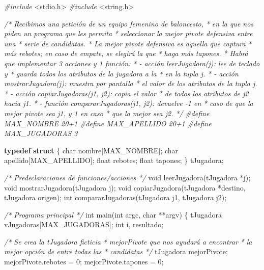 \documentclass[
]{book}
\newenvironment{Shaded}{\begin{snugshade}}{\end{snugshade}}
\newcommand{\CommentTok}[1]{\textcolor[rgb]{0.56,0.35,0.01}{\textit{#1}}}
\newcommand{\DataTypeTok}[1]{\textcolor[rgb]{0.13,0.29,0.53}{#1}}
\newcommand{\DecValTok}[1]{\textcolor[rgb]{0.00,0.00,0.81}{#1}}
\newcommand{\ImportTok}[1]{#1}
\newcommand{\KeywordTok}[1]{\textcolor[rgb]{0.13,0.29,0.53}{\textbf{#1}}}
\newcommand{\NormalTok}[1]{#1}
\newcommand{\PreprocessorTok}[1]{\textcolor[rgb]{0.56,0.35,0.01}{\textit{#1}}}
\begin{document}
\begin{Shaded}
\begin{Highlighting}[]
\PreprocessorTok{\#include }\ImportTok{\textless{}stdio.h\textgreater{}}
\PreprocessorTok{\#include }\ImportTok{\textless{}string.h\textgreater{}}

\CommentTok{/* Recibimos una petición de un equipo femenino de baloncesto,}
\CommentTok{ * en la que nos piden un programa que les permita}
\CommentTok{ * seleccionar la mejor pivote defensiva entre una}
\CommentTok{ * serie de candidatas.}
\CommentTok{ * La mejor pivote defensiva es aquella que captura}
\CommentTok{ * más rebotes; en caso de empate, se elegirá la que}
\CommentTok{ * haga más tapones.}
\CommentTok{ * Habrá que implementar 3 acciones y 1 función:}
\CommentTok{ * {-} acción leerJugadora(j): lee de teclado y}
\CommentTok{ *   guarda todos los atributos de la jugadora a la}
\CommentTok{ *   en la tupla j.}
\CommentTok{ * {-} acción mostrarJugadora(j): muestra por pantalla}
\CommentTok{ *   el valor de los atributos de la tupla j.}
\CommentTok{ * {-} acción copiarJugadoras(j1, j2): copia el valor}
\CommentTok{ *   de todos los atributos de j2 hacia j1.}
\CommentTok{ * {-} función compararJugadoras(j1, j2): devuelve {-}1 en}
\CommentTok{ *   caso de que la mejor pivote sea j1, y 1 en caso}
\CommentTok{ *   que la mejor sea j2.}
\CommentTok{ */}
\PreprocessorTok{\#define MAX\_NOMBRE 20+1}
\PreprocessorTok{\#define MAX\_APELLIDO 20+1}
\PreprocessorTok{\#define MAX\_JUGADORAS 3}

\KeywordTok{typedef} \KeywordTok{struct}\NormalTok{ \{}
    \DataTypeTok{char}\NormalTok{ nombre[MAX\_NOMBRE];}
    \DataTypeTok{char}\NormalTok{ apellido[MAX\_APELLIDO];}
    \DataTypeTok{float}\NormalTok{ rebotes;}
    \DataTypeTok{float}\NormalTok{ tapones;}
\NormalTok{\} tJugadora;}

\CommentTok{/* Predeclaraciones de funciones/acciones */}
\DataTypeTok{void}\NormalTok{ leerJugadora(tJugadora *j);}
\DataTypeTok{void}\NormalTok{ mostrarJugadora(tJugadora j);}
\DataTypeTok{void}\NormalTok{ copiarJugadora(tJugadora *destino, tJugadora origen);}
\DataTypeTok{int}\NormalTok{ compararJugadoras(tJugadora j1, tJugadora j2);}

\CommentTok{/* Programa principal */}
\DataTypeTok{int}\NormalTok{ main(}\DataTypeTok{int}\NormalTok{ argc, }\DataTypeTok{char}\NormalTok{ **argv) \{}
\NormalTok{    tJugadora vJugadoras[MAX\_JUGADORAS];}
    \DataTypeTok{int}\NormalTok{ i, resultado;}

    \CommentTok{/* Se crea la tJugadora ficticia}
\CommentTok{     * mejorPivote que nos ayudará a encontrar}
\CommentTok{     * la mejor opción de entre todas las}
\CommentTok{     * candidatas}
\CommentTok{     */}
\NormalTok{    tJugadora mejorPivote; }
\NormalTok{    mejorPivote.rebotes = }\DecValTok{0}\NormalTok{;}
\NormalTok{    mejorPivote.tapones = }\DecValTok{0}\NormalTok{;}


\end{Highlighting}
\end{Shaded}
\end{document}
